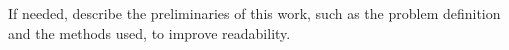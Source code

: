 If needed, describe the preliminaries of this work, such as the problem definition and the methods used, to improve readability.

